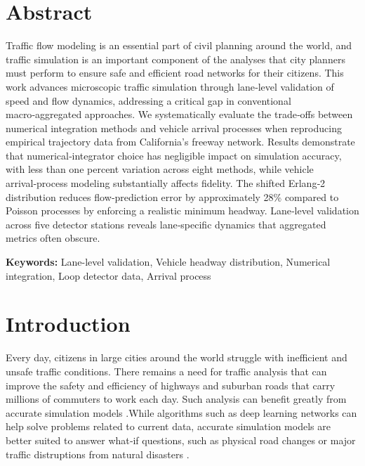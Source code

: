 \documentclass{scspaperproc}
\theoremstyle{scsthe}
\begin{document}
\maketitle
\section*{Abstract}
Traffic flow modeling is an essential part of civil planning around the world, and traffic simulation is an
important component of the analyses that city planners must perform to ensure safe and efficient road networks for
their citizens. This work advances microscopic traffic simulation through lane‑level validation of speed and flow
dynamics, addressing a critical gap in conventional macro‑aggregated approaches. We systematically evaluate the
trade‑offs between numerical integration methods and vehicle arrival processes when reproducing empirical trajectory
data from California’s freeway network. Results demonstrate that numerical‑integrator choice has negligible impact
on simulation accuracy, with less than one percent variation across eight methods, while vehicle arrival‑process modeling substantially affects fidelity. The shifted Erlang‑2 distribution reduces flow‑prediction error by approximately
28\% compared to Poisson processes by enforcing a realistic minimum headway. Lane‑level validation across five
detector stations reveals lane‑specific dynamics that aggregated metrics often obscure.

\textbf{Keywords: }{Lane-level validation, Vehicle headway distribution, Numerical integration, Loop detector data, Arrival process}


\section{Introduction}
\label{sec:intro}
Every day, citizens in large cities around the world struggle with inefficient and unsafe traffic conditions.
There remains a need for traffic analysis that can improve the safety and efficiency of highways and suburban roads that carry millions of commuters to work each day. Such analysis can benefit greatly from accurate simulation models \cite{law2007simulation}.While algorithms such as deep learning networks can help solve problems related to current data, accurate simulation models are better suited to answer what‑if questions, such as physical road changes or major traffic distruptions from natural disasters \cite{fishman2001discrete}.
\end{document}
